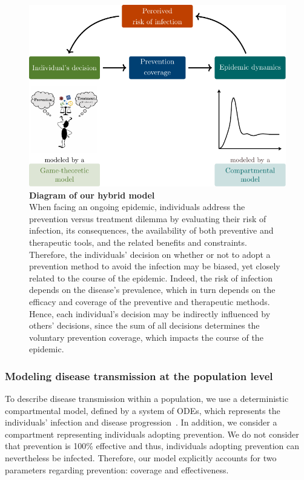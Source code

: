\begin{figure}[H]
	\centering	
	\includegraphics{Figures/Intro/TikZ_Model/ModelDiagram}
	\caption[Diagram of our hybrid model]{%
		{\bf Diagram of our hybrid model}\\
	When facing an ongoing epidemic, individuals address the prevention versus treatment dilemma by evaluating their risk of infection, its consequences, the availability of both preventive and therapeutic tools, and the related benefits and constraints. Therefore, the individuals' decision on whether or not to adopt a prevention method to avoid the infection may be biased, yet closely related to the course of the epidemic. Indeed, the risk of infection depends on the disease's prevalence, which in turn depends on the efficacy and coverage of the preventive and therapeutic methods. Hence, each individual's decision may be indirectly influenced by others' decisions, since the sum of all decisions determines the voluntary prevention coverage, which impacts the course of the epidemic.
	}
	\label{ModelDiagram}
\end{figure}

\subsubsection*{Modeling disease transmission at the population level}
To describe disease transmission within a population, we use a deterministic compartmental model, defined by a system of ODEs, which represents the individuals' infection and disease progression~\cite[]{Hethcote2000,Jacquez1988}. In addition, we consider a compartment representing individuals adopting prevention. We do not consider that prevention is 100\% effective and thus, individuals adopting prevention can nevertheless be infected. Therefore, our model explicitly accounts for two parameters regarding prevention: coverage and effectiveness.

